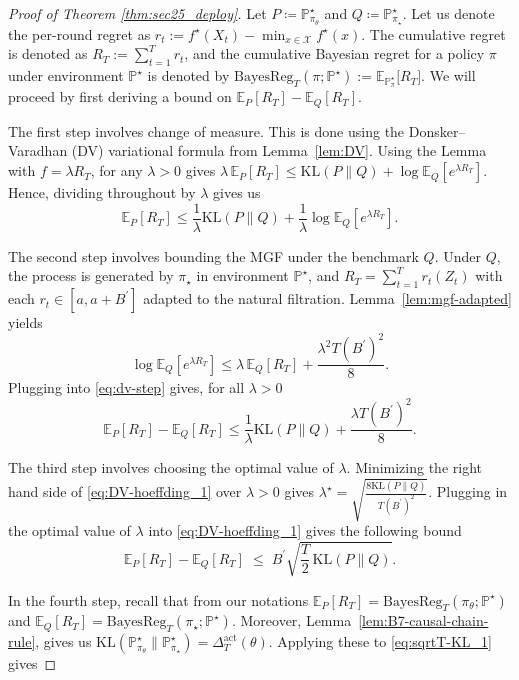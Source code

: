 \documentclass[11pt]{article}
\renewcommand{\P}{\mathbb{P}}
\providecommand{\E}{\mathbb{E}}
\begin{document}
\begin{proof}[Proof of Theorem \ref{thm:sec25_deploy}]
Let \(P\coloneqq \P^\star_{\pi_\theta}\) and \(Q\coloneqq \P^\star_{\pi_\star}\). Let us denote the per-round regret as $r_t := f^\star(X_t) - \min_{x \in \mathcal X}f^\star(x)$. The cumulative regret is denoted as $R_T := \sum_{t=1}^T r_t$, and the cumulative Bayesian regret for a policy $\pi$ under environment $\P^\star$ is denoted by $\mathrm{BayesReg}_T(\pi;\P^\star) := \mathbb E_{\P^\star_{\pi}}\!\big[R_T\big]$. We will proceed by first deriving a bound on \(\E_{P}[R_T]-\E_{Q}[R_T].\)

The first step involves change of measure. This is done using the Donsker–Varadhan (DV) variational formula from Lemma~\ref{lem:DV}. Using the Lemma with $f=\lambda R_T$, for any $\lambda > 0$ gives $\lambda\,\mathbb E_P[R_T] \le \mathrm{KL}(P\|Q) + \log \mathbb E_Q[e^{\lambda R_T}]$. Hence, dividing throughout by $\lambda$ gives us
\begin{equation}
\label{eq:dv-step}
\mathbb E_P[R_T]
\le
\frac{1}{\lambda}\mathrm{KL}(P\|Q) + \frac{1}{\lambda}\log \mathbb E_Q[e^{\lambda R_T}].
\end{equation}

The second step involves bounding the MGF under the benchmark $Q$. Under $Q$, the process is generated by $\pi_\star$ in environment $\P^\star$, and $R_T=\sum_{t=1}^T r_t(Z_t)$ with each $r_t\in[a, a + B^\prime]$ adapted to the natural filtration.
Lemma~\ref{lem:mgf-adapted} yields
\[
\log \mathbb E_Q[e^{\lambda R_T}]
\le
\lambda\,\mathbb E_Q[R_T] + \frac{\lambda^2 T (B^\prime)^2}{8}.
\]
Plugging into \eqref{eq:dv-step} gives, for all $\lambda > 0$
\begin{equation}
\label{eq:DV-hoeffding_1}
\mathbb E_P[R_T] - \mathbb E_Q[R_T] \le \frac{1}{\lambda}\mathrm{KL}(P\|Q) + \frac{\lambda T (B^\prime)^2}{8}.
\end{equation}

The third step involves choosing the optimal value of $\lambda$. Minimizing the right hand side of \eqref{eq:DV-hoeffding_1} over \(\lambda>0\) gives
\(
\lambda^\star=\sqrt{\frac{8\mathrm{KL}(P\|Q)}{T (B^\prime)^2}}
\). Plugging in the optimal value of $\lambda$ into \eqref{eq:DV-hoeffding_1} gives the following bound
\begin{equation}
\label{eq:sqrtT-KL_1}
\E_{P}[R_T]-\E_{Q}[R_T]
\;\le\;
B^\prime \sqrt{\frac{T}{2}\,\mathrm{KL}(P\|Q)}.
\end{equation}

In the fourth step, recall that from our notations $\mathbb E_P[R_T]=\mathrm{BayesReg}_T(\pi_\theta;\P^\star)$ and $\mathbb E_Q[R_T]=\mathrm{BayesReg}_T(\pi_\star;\P^\star)$. Moreover, Lemma~\ref{lem:B7-causal-chain-rule}, gives us
$\mathrm{KL}(\P_{\pi_\theta}^\star\|\P_{\pi_\star}^\star)=\Delta_{T}^{\mathrm{act}}(\theta)$. Applying these to \eqref{eq:sqrtT-KL_1} gives


\end{proof}
\end{document}
